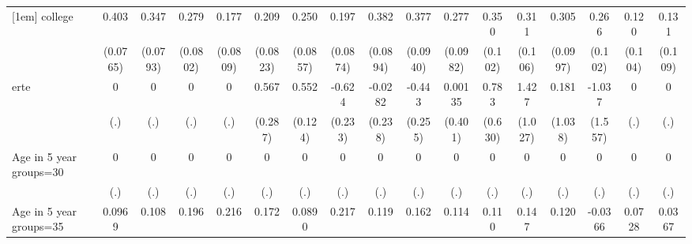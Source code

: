 {\begin{tabular}{l*{16}{c}}
[1em]
college             &       0.403\sym{***}&       0.347\sym{***}&       0.279\sym{***}&       0.177\sym{*}  &       0.209\sym{*}  &       0.250\sym{**} &       0.197\sym{*}  &       0.382\sym{***}&       0.377\sym{***}&       0.277\sym{**} &       0.350\sym{***}&       0.311\sym{**} &       0.305\sym{**} &       0.266\sym{**} &       0.120         &       0.131         \\
                    &    (0.0765)         &    (0.0793)         &    (0.0802)         &    (0.0809)         &    (0.0823)         &    (0.0857)         &    (0.0874)         &    (0.0894)         &    (0.0940)         &    (0.0982)         &     (0.102)         &     (0.106)         &    (0.0997)         &     (0.102)         &     (0.104)         &     (0.109)         \\
[1em]
erte                &           0         &           0         &           0         &           0         &       0.567\sym{*}  &       0.552\sym{***}&      -0.624\sym{**} &     -0.0282         &      -0.443         &     0.00135         &       0.783         &       1.427         &       0.181         &      -1.037         &           0         &           0         \\
                    &         (.)         &         (.)         &         (.)         &         (.)         &     (0.287)         &     (0.124)         &     (0.233)         &     (0.238)         &     (0.255)         &     (0.401)         &     (0.630)         &     (1.027)         &     (1.038)         &     (1.557)         &         (.)         &         (.)         \\
[1em]
Age in 5 year groups=30&           0         &           0         &           0         &           0         &           0         &           0         &           0         &           0         &           0         &           0         &           0         &           0         &           0         &           0         &           0         &           0         \\
                    &         (.)         &         (.)         &         (.)         &         (.)         &         (.)         &         (.)         &         (.)         &         (.)         &         (.)         &         (.)         &         (.)         &         (.)         &         (.)         &         (.)         &         (.)         &         (.)         \\
[1em]
Age in 5 year groups=35&      0.0969         &       0.108         &       0.196\sym{**} &       0.216\sym{***}&       0.172\sym{**} &      0.0890         &       0.217\sym{**} &       0.119         &       0.162\sym{*}  &       0.114         &       0.110         &       0.147         &       0.120         &     -0.0366         &      0.0728         &      0.0367         \\

\end{tabular}}
